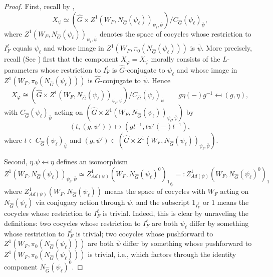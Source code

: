 \begin{theorem}
    \begin{proof}
    	First, recall by \cite[Subsection 4.6]{dat2022ihes},
    	$$X_{\psi} \simeq \left(\hat{G} \times Z^1(W_F, N_{\hat{G}}(\psi_{\ell}))_{\psi_{\ell}, \overline{\psi}}\right)/C_{\hat{G}}(\psi_{\ell})_{\overline{\psi}},$$
    	where $Z^1(W_F, N_{\hat{G}}(\psi_{\ell}))_{\psi_{\ell}, \overline{\psi}}$  denotes the space of cocycles whose restriction to $I_F^{\ell}$ equals $\psi_{\ell}$ and whose image in $Z^1(W_F, \pi_0(N_{\hat{G}}(\psi_{\ell})))$ is $\overline{\psi}$. 
    	More precisely, recall (See \cite[Subsection 4.6]{dat2022ihes}) first that the component $X_{\varphi}=X_{\psi}$ morally consists of the $L$-parameters whose restriction to $I_F^{\ell}$ is $\hat{G}$-conjugate to $\psi_{\ell}$ and whose image in $Z^1(W_F, \pi_0(N_{\hat{G}}(\psi_{\ell})))$ is $\hat{G}$-conjugate to $\overline{\psi}$. Hence 
    	$$X_{\varphi} \cong (\hat{G} \times Z^1(W_F, N_{\hat{G}}(\psi_{\ell}))_{\psi_{\ell}, \overline{\psi}})/C_{\hat{G}}(\psi_{\ell})_{\overline{\psi}} \qquad g\eta(-)g^{-1} \mapsfrom (g, \eta),$$
    	with $C_{\hat{G}}(\psi_{\ell})_{\overline{\psi}}$ acting on $(\hat{G} \times Z^1(W_F, N_{\hat{G}}(\psi_{\ell}))_{\psi_{\ell}, \overline{\psi}})$ by 
    	$$(t, (g, \psi')) \mapsto (gt^{-1}, t\psi'(-)t^{-1}),$$
    	where $t \in C_{\hat{G}}(\psi_{\ell})_{\overline{\psi}}$ and $(g, \psi') \in (\hat{G} \times Z^1(W_F, N_{\hat{G}}(\psi_{\ell}))_{\psi_{\ell}, \overline{\psi}})$.
    	
    	Second, $\eta.\psi \mapsfrom \eta$ defines an isomorphism
    	$$Z^1(W_F, N_{\hat{G}}(\psi_{\ell}))_{\psi_{\ell}, \overline{\psi}} \simeq Z^1_{Ad(\psi)}(W_F, N_{\hat{G}}(\psi_{\ell})^0)_{1_{I_F^{\ell}}}=:Z^1_{Ad(\psi)}(W_F, N_{\hat{G}}(\psi_{\ell})^0)_1$$
    	where $Z^1_{Ad(\psi)}(W_F, N_{\hat{G}}(\psi_{\ell}))$ means the space of cocycles with $W_F$ acting on $N_{\hat{G}}(\psi_{\ell})$ via conjugacy action through $\psi$, and the subscript $1_{I_F^{\ell}}$ or $1$ means the cocycles whose restriction to $I_F^{\ell}$ is trivial. 
    	Indeed, this is clear by unraveling the definitions: two cocycles whose restriction to $I_F^\ell$ are both $\psi_{\ell}$ differ by something whose restriction to $I_F^{\ell}$ is trivial; two cocycles whose pushforward to $Z^1(W_F, \pi_0(N_{\hat{G}}(\psi_{\ell})))$ are both $\overline{\psi}$ differ by something whose pushforward to $Z^1(W_F, \pi_0(N_{\hat{G}}(\psi_{\ell})))$ is trivial, i.e., which factors through the identity component $N_{\hat{G}}(\psi_{\ell})^0$.
    	

\end{proof}
\end{theorem}
